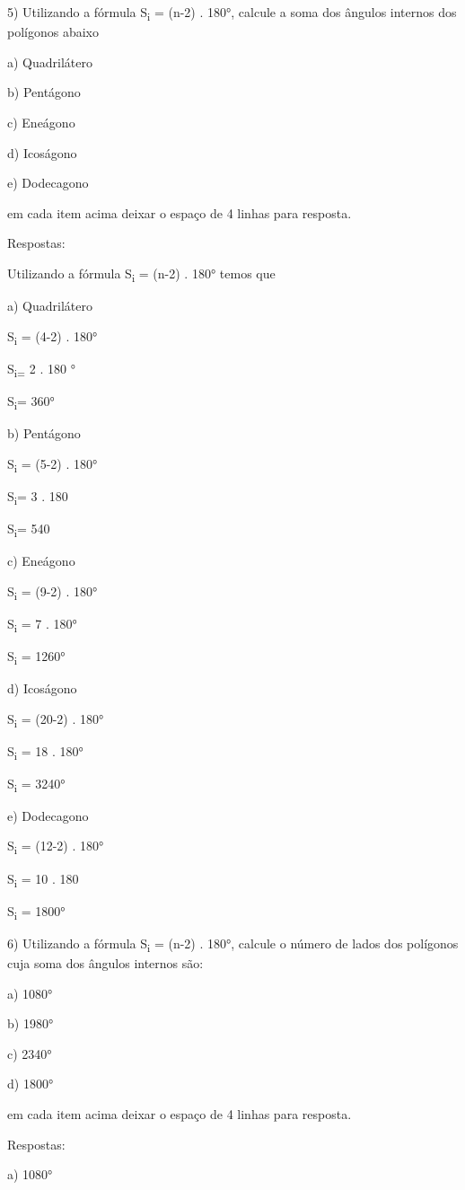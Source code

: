 {5) Utilizando a fórmula S\textsubscript{i} = (n-2) . 180°, calcule a
soma dos ângulos internos dos polígonos abaixo

a) Quadrilátero

b) Pentágono

c) Eneágono

d) Icoságono

e) Dodecagono

em cada item acima deixar o espaço de 4 linhas para resposta.

Respostas:

Utilizando a fórmula S\textsubscript{i} = (n-2) . 180° temos que

a) Quadrilátero

S\textsubscript{i} = (4-2) . 180°

S\textsubscript{i=} 2 . 180 °

S\textsubscript{i}= 360°

b) Pentágono

S\textsubscript{i} = (5-2) . 180°

S\textsubscript{i}= 3 . 180

S\textsubscript{i}= 540

c) Eneágono

S\textsubscript{i} = (9-2) . 180°

S\textsubscript{i} = 7 . 180°

S\textsubscript{i} = 1260°

d) Icoságono

S\textsubscript{i} = (20-2) . 180°

S\textsubscript{i} = 18 . 180°

S\textsubscript{i} = 3240°

e) Dodecagono

S\textsubscript{i} = (12-2) . 180°

S\textsubscript{i} = 10 . 180

S\textsubscript{i} = 1800°

6) Utilizando a fórmula S\textsubscript{i} = (n-2) . 180°, calcule o
número de lados dos polígonos cuja soma dos ângulos internos são:

a) 1080°

b) 1980°

c) 2340°

d) 1800°

em cada item acima deixar o espaço de 4 linhas para resposta.

Respostas:

a) 1080°

}
